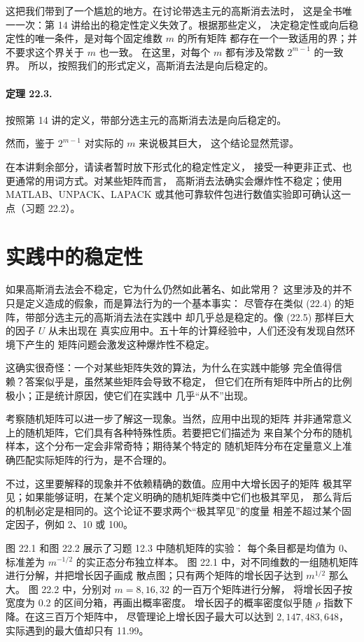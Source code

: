 \documentclass[UTF8,fontset=none,12pt]{ctexart}
\begin{document}
这把我们带到了一个尴尬的地方。在讨论带选主元的高斯消去法时，
这是全书唯一一次：第 14 讲给出的稳定性定义失效了。根据那些定义，
决定稳定性或向后稳定性的唯一条件，是对每个固定维数 $m$ 的所有矩阵
都存在一个一致适用的界；并不要求这个界关于 $m$ 也一致。
在这里，对每个 $m$ 都有涉及常数 $2^{m-1}$ 的一致界。
所以，按照我们的形式定义，高斯消去法是向后稳定的。

\paragraph{定理 22.3.}
按照第 14 讲的定义，带部分选主元的高斯消去法是向后稳定的。

然而，鉴于 $2^{m-1}$ 对实际的 $m$ 来说极其巨大，
这个结论显然荒谬。

在本讲剩余部分，请读者暂时放下形式化的稳定性定义，
接受一种更非正式、也更通常的用词方式。对某些矩阵而言，
高斯消去法确实会爆炸性不稳定；使用 MATLAB、UNPACK、LAPACK
或其他可靠软件包进行数值实验即可确认这一点（习题 22.2）。

\section*{实践中的稳定性}

如果高斯消去法会不稳定，它为什么仍然如此著名、如此常用？
这里涉及的并不只是定义造成的假象，而是算法行为的一个基本事实：
尽管存在类似 (22.4) 的矩阵，带部分选主元的高斯消去法在实践中
却几乎总是稳定的。像 (22.5) 那样巨大的因子 $U$ 从未出现在
真实应用中。五十年的计算经验中，人们还没有发现自然环境下产生的
矩阵问题会激发这种爆炸性不稳定。

这确实很奇怪：一个对某些矩阵失效的算法，为什么在实践中能够
完全值得信赖？答案似乎是，虽然某些矩阵会导致不稳定，
但它们在所有矩阵中所占的比例极小；正是统计原因，使它们在实践中
几乎“从不”出现。

考察随机矩阵可以进一步了解这一现象。当然，应用中出现的矩阵
并非通常意义上的随机矩阵，它们具有各种特殊性质。若要把它们描述为
来自某个分布的随机样本，这个分布一定会非常奇特；期待某个特定的
随机矩阵分布在定量意义上准确匹配实际矩阵的行为，是不合理的。

不过，这里要解释的现象并不依赖精确的数值。应用中大增长因子的矩阵
极其罕见；如果能够证明，在某个定义明确的随机矩阵类中它们也极其罕见，
那么背后的机制必定是相同的。这个论证不要求两个“极其罕见”的度量
相差不超过某个固定因子，例如 2、10 或 100。

图 22.1 和图 22.2 展示了习题 12.3 中随机矩阵的实验：
每个条目都是均值为 0、标准差为 $m^{-1/2}$ 的实正态分布独立样本。
图 22.1 中，对不同维数的一组随机矩阵进行分解，并把增长因子画成
散点图；只有两个矩阵的增长因子达到 $m^{1/2}$ 那么大。
图 22.2 中，分别对 $m=8,16,32$ 的一百万个矩阵进行分解，
将增长因子按宽度为 0.2 的区间分箱，再画出概率密度。
增长因子的概率密度似乎随 $\rho$ 指数下降。在这三百万个矩阵中，
尽管理论上增长因子最大可以达到
$2{,}147{,}483{,}648$，实际遇到的最大值却只有 11.99。
\end{document}
